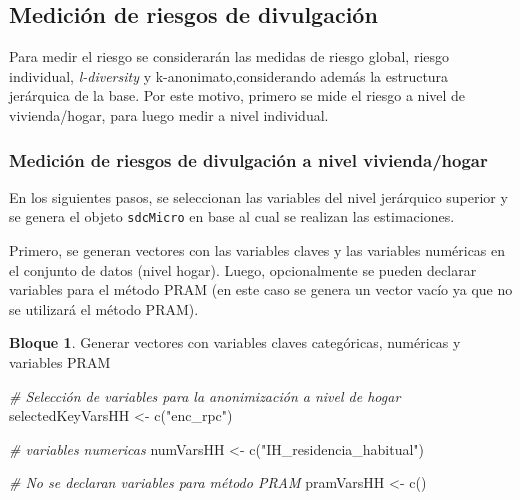 \documentclass[
]{book}
\newenvironment{Shaded}{\begin{snugshade}}{\end{snugshade}}
\newcommand{\CommentTok}[1]{\textcolor[rgb]{0.56,0.35,0.01}{\textit{#1}}}
\newcommand{\FunctionTok}[1]{\textcolor[rgb]{0.00,0.00,0.00}{#1}}
\newcommand{\NormalTok}[1]{#1}
\newcommand{\OtherTok}[1]{\textcolor[rgb]{0.56,0.35,0.01}{#1}}
\newcommand{\StringTok}[1]{\textcolor[rgb]{0.31,0.60,0.02}{#1}}
\theoremstyle{definition}
\theoremstyle{definition}
\newtheorem{example}{Bloque}[chapter]
\theoremstyle{definition}
\theoremstyle{definition}
\theoremstyle{remark}
\begin{document}
\hypertarget{mediciuxf3n-de-riesgos-de-divulgaciuxf3n}{%
\subsection{Medición de riesgos de divulgación}\label{mediciuxf3n-de-riesgos-de-divulgaciuxf3n}}

Para medir el riesgo se considerarán las medidas de riesgo global, riesgo individual, \emph{l-diversity} y k-anonimato,considerando además la estructura jerárquica de la base. Por este motivo, primero se mide el riesgo a nivel de vivienda/hogar, para luego medir a nivel individual.

\hypertarget{mediciuxf3n-de-riesgos-de-divulgaciuxf3n-a-nivel-viviendahogar}{%
\subsubsection{Medición de riesgos de divulgación a nivel vivienda/hogar}\label{mediciuxf3n-de-riesgos-de-divulgaciuxf3n-a-nivel-viviendahogar}}

En los siguientes pasos, se seleccionan las variables del nivel jerárquico superior y se genera el objeto \texttt{sdcMicro} en base al cual se realizan las estimaciones.

Primero, se generan vectores con las variables claves y las variables numéricas en el conjunto de datos (nivel hogar). Luego, opcionalmente se pueden declarar variables para el método PRAM (en este caso se genera un vector vacío ya que no se utilizará el método PRAM).

\begin{example}
\protect\hypertarget{exm:bloque38nbm}{}\label{exm:bloque38nbm}Generar vectores con variables claves categóricas, numéricas y variables PRAM
\end{example}

\begin{Shaded}
\begin{Highlighting}[]
\CommentTok{\# Selección de variables para la anonimización a nivel de hogar}
\NormalTok{selectedKeyVarsHH }\OtherTok{\textless{}{-}} \FunctionTok{c}\NormalTok{(}\StringTok{"enc\_rpc"}\NormalTok{)}

\CommentTok{\# variables numericas}
\NormalTok{numVarsHH }\OtherTok{\textless{}{-}} \FunctionTok{c}\NormalTok{(}\StringTok{"IH\_residencia\_habitual"}\NormalTok{)}

\CommentTok{\# No se declaran variables para método PRAM}
\NormalTok{pramVarsHH }\OtherTok{\textless{}{-}} \FunctionTok{c}\NormalTok{()}
\end{Highlighting}
\end{Shaded}
\end{document}
